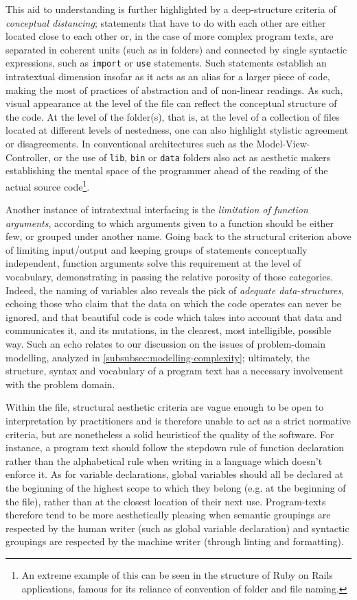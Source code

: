This aid to understanding is further highlighted by a deep-structure criteria of \emph{conceptual distancing}; statements that have to do with each other are either located close to each other or, in the case of more complex program texts, are separated in coherent units (such as in folders) and connected by single syntactic expressions, such as \lstinline{import} or \lstinline{use} statements. Such statements establish an intratextual dimension insofar as it acts as an alias for a larger piece of code, making the most of practices of abstraction and of non-linear readings. As such, visual appearance at the level of the file can reflect the conceptual structure of the code. At the level of the folder(s), that is, at the level of a collection of files located at different levels of nestedness, one can also highlight stylistic agreement or disagreements. In conventional architectures such as the Model-View-Controller, or the use of \lstinline{lib}, \lstinline{bin} or \lstinline{data} folders also act as aesthetic makers establishing the mental space of the programmer ahead of the reading of the actual source code\footnote{An extreme example of this can be seen in the structure of Ruby on Rails applications, famous for its reliance of convention of folder and file naming.}.

Another instance of intratextual interfacing is the \emph{limitation of function arguments}, according to which arguments given to a function should be either few, or grouped under another name. Going back to the structural criterion above of limiting input/output and keeping groups of statements conceptually independent, function arguments solve this requirement at the level of vocabulary, demonstrating in passing the relative porosity of those categories. Indeed, the naming of variables also reveals the pick of \emph{adequate data-structures}, echoing those who claim that the data on which the code operates can never be ignored, and that beautiful code is code which takes into account that data and communicates it, and its mutations, in the clearest, most intelligible, possible way. Such an echo relates to our discussion on the issues of problem-domain modelling, analyzed in \ref{subsubsec:modelling-complexity}; ultimately, the structure, syntax and vocabulary of a program text has a necessary involvement with the problem domain.

Within the file, structural aesthetic criteria are vague enough to be open to interpretation by practitioners and is therefore unable to act as a strict normative criteria, but are nonetheless a solid heuristicof the quality of the software. For instance, a program text should follow the stepdown rule of function declaration rather than the alphabetical rule when writing in a language which doesn't enforce it. As for variable declarations, global variables should all be declared at the beginning of the highest scope to which they belong (e.g. at the beginning of the file), rather than at the closest location of their next use. Program-texts therefore tend to be more aesthetically pleasing when semantic groupings are respected by the human writer (such as global variable declaration) and syntactic groupings are respected by the machine writer (through linting and formatting).

